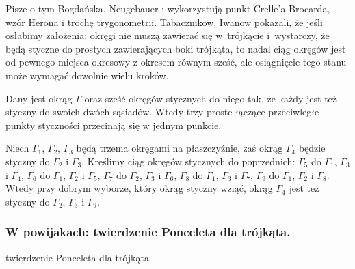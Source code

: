 Pisze o tym Bogdańska, Neugebauer \cite[s. 101]{neugebauer_2018}: wykorzystują punkt Crelle'a-Brocarda, wzór Herona i trochę trygonometrii.
Tabacznikow, Iwanow \cite{ivanov_tabachnikov_2016} pokazali, że jeśli osłabimy założenia: okręgi nie muszą zawierać się w~trójkącie i~wystarczy, że będą styczne do prostych zawierających boki trójkąta, to nadal ciąg okręgów jest od pewnego miejsca okresowy z okresem równym sześć, ale osiągnięcie tego stanu może wymagać dowolnie wielu kroków.
%
%

\begin{proposition}
	Dany jest okrąg $\Gamma$ oraz sześć okręgów stycznych do niego tak, że każdy jest też styczny do swoich dwóch sąsiadów.
	Wtedy trzy proste łączące przeciwległe punkty styczności przecinają się w jednym punkcie.
\end{proposition}

\begin{proposition}
	Niech $\Gamma_1$, $\Gamma_2$, $\Gamma_3$ będą trzema okręgami na płaszczyźnie, zaś okrąg $\Gamma_4$ będzie styczny do $\Gamma_2$ i $\Gamma_3$.
	Kreślimy ciąg okręgów stycznych do poprzednich:
	$\Gamma_5$ do $\Gamma_1$, $\Gamma_3$ i $\Gamma_4$,
	$\Gamma_6$ do $\Gamma_1$, $\Gamma_2$ i $\Gamma_5$,
	$\Gamma_7$ do $\Gamma_2$, $\Gamma_3$ i $\Gamma_6$,
	$\Gamma_8$ do $\Gamma_1$, $\Gamma_3$ i $\Gamma_7$,
	$\Gamma_9$ do $\Gamma_1$, $\Gamma_2$ i $\Gamma_8$.
	Wtedy przy dobrym wyborze, który okrąg styczny wziąć, okrąg $\Gamma_4$ jest też styczny do $\Gamma_2$, $\Gamma_3$ i $\Gamma_9$.
\end{proposition}



\subsubsection{W powijakach: twierdzenie Ponceleta dla trójkąta.}
twierdzenie Ponceleta dla trójkąta
